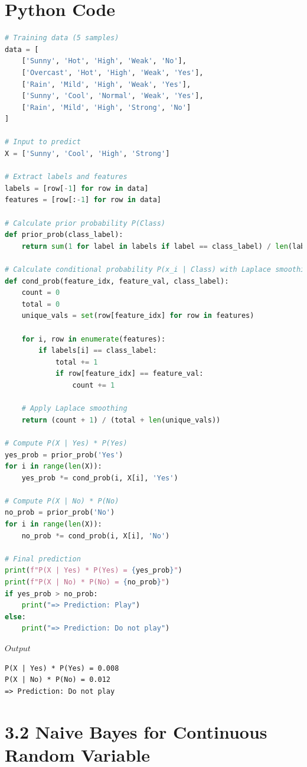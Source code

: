 \documentclass{article}
\begin{document}
\section*{Python Code}
\begin{lstlisting}[language=Python, caption={Naive Bayes Classifier}]
# Training data (5 samples)
data = [
    ['Sunny', 'Hot', 'High', 'Weak', 'No'],
    ['Overcast', 'Hot', 'High', 'Weak', 'Yes'],
    ['Rain', 'Mild', 'High', 'Weak', 'Yes'],
    ['Sunny', 'Cool', 'Normal', 'Weak', 'Yes'],
    ['Rain', 'Mild', 'High', 'Strong', 'No']
]

# Input to predict
X = ['Sunny', 'Cool', 'High', 'Strong']

# Extract labels and features
labels = [row[-1] for row in data]
features = [row[:-1] for row in data]

# Calculate prior probability P(Class)
def prior_prob(class_label):
    return sum(1 for label in labels if label == class_label) / len(labels)

# Calculate conditional probability P(x_i | Class) with Laplace smoothing
def cond_prob(feature_idx, feature_val, class_label):
    count = 0
    total = 0
    unique_vals = set(row[feature_idx] for row in features)

    for i, row in enumerate(features):
        if labels[i] == class_label:
            total += 1
            if row[feature_idx] == feature_val:
                count += 1

    # Apply Laplace smoothing
    return (count + 1) / (total + len(unique_vals))

# Compute P(X | Yes) * P(Yes)
yes_prob = prior_prob('Yes')
for i in range(len(X)):
    yes_prob *= cond_prob(i, X[i], 'Yes')

# Compute P(X | No) * P(No)
no_prob = prior_prob('No')
for i in range(len(X)):
    no_prob *= cond_prob(i, X[i], 'No')

# Final prediction
print(f"P(X | Yes) * P(Yes) = {yes_prob}")
print(f"P(X | No) * P(No) = {no_prob}")
if yes_prob > no_prob:
    print("=> Prediction: Play")
else:
    print("=> Prediction: Do not play")
\end{lstlisting}


$Output$

\begin{lstlisting}
P(X | Yes) * P(Yes) = 0.008
P(X | No) * P(No) = 0.012
=> Prediction: Do not play
\end{lstlisting}


\section*{3.2 Naive Bayes for Continuous Random Variable}
\end{document}
